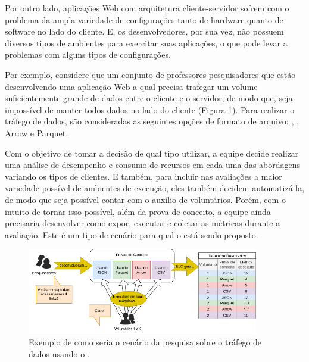 \documentclass[12pt]{tcc}
\begin{document}
Por outro lado, aplicações Web com arquitetura cliente-servidor sofrem com o problema da ampla variedade de configurações tanto de hardware quanto de software no lado do cliente. E, os desenvolvedores, por sua vez, não possuem diversos tipos de ambientes para exercitar suas aplicações, o que pode levar a problemas com alguns tipos de configurações. %


Por exemplo, considere que um conjunto de professores pesquisadores que estão desenvolvendo uma aplicação Web a qual precisa trafegar um volume suficientemente grande de dados entre o cliente e o servidor, de modo que, seja impossível de manter todos dados no lado do cliente (Figura \ref{fig:exemplo-tipo-de-dado}). Para realizar o tráfego de dados, são consideradas as seguintes opções de formato de arquivo: , , Arrow e Parquet. 

Com o objetivo de tomar a decisão de qual tipo utilizar, a equipe decide realizar uma análise de desempenho e consumo de recursos em cada uma das abordagens variando os tipos de clientes. E também, para incluir nas avaliações a maior variedade possível de ambientes de execução, eles também decidem automatizá-la, de modo que seja possível contar com o auxílio de voluntários. Porém, com o intuito de tornar isso possível, além da prova de conceito, a equipe ainda precisaria desenvolver como expor, executar e coletar as métricas durante a avaliação. Este é um tipo de cenário para qual o  está sendo proposto. 

\begin{figure}[!ht]
	\centering
	\includegraphics[width=0.9\textwidth]{figures/exemplo-tipo-de-dado.png}
	\caption{Exemplo de como seria o cenário da pesquisa sobre o tráfego de dados usando o .}
	\label{fig:exemplo-tipo-de-dado}
\end{figure}
\end{document}
